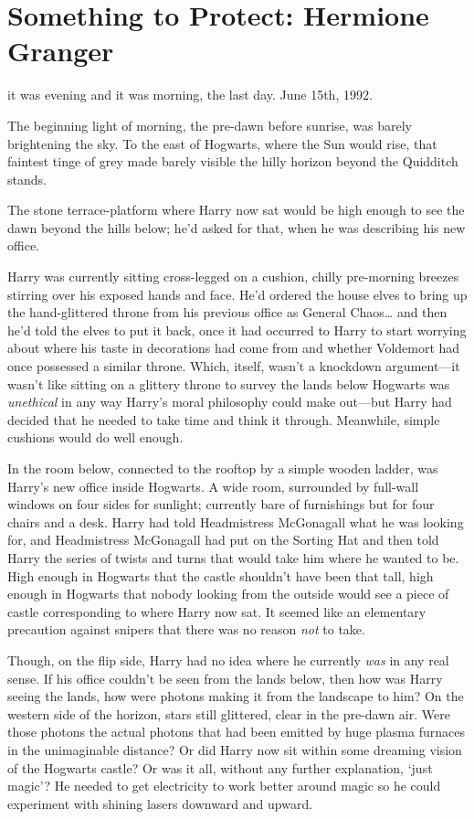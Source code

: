 \chapter{Something to Protect: Hermione Granger}

 it was evening and it was morning, the last day. June 15th, 1992.

\hplettrineextrapara
The beginning light of morning, the pre-dawn before sunrise, was barely brightening the sky. To the east of Hogwarts, where the Sun would rise, that faintest tinge of grey made barely visible the hilly horizon beyond the Quidditch stands.

The stone terrace-platform where Harry now sat would be high enough to see the dawn beyond the hills below; he'd asked for that, when he was describing his new office.

Harry was currently sitting cross-legged on a cushion, chilly pre-morning breezes stirring over his exposed hands and face. He'd ordered the house elves to bring up the hand-glittered throne from his previous office as General Chaos{\ldots} and then he'd told the elves to put it back, once it had occurred to Harry to start worrying about where his taste in decorations had come from and whether Voldemort had once possessed a similar throne. Which, itself, wasn't a knockdown argument—it wasn't like sitting on a glittery throne to survey the lands below Hogwarts was \emph{unethical} in any way Harry's moral philosophy could make out—but Harry had decided that he needed to take time and think it through. Meanwhile, simple cushions would do well enough.

In the room below, connected to the rooftop by a simple wooden ladder, was Harry's new office inside Hogwarts. A wide room, surrounded by full-wall windows on four sides for sunlight; currently bare of furnishings but for four chairs and a desk. Harry had told Headmistress McGonagall what he was looking for, and Headmistress McGonagall had put on the Sorting Hat and then told Harry the series of twists and turns that would take him where he wanted to be. High enough in Hogwarts that the castle shouldn't have been that tall, high enough in Hogwarts that nobody looking from the outside would see a piece of castle corresponding to where Harry now sat. It seemed like an elementary precaution against snipers that there was no reason \emph{not} to take.

Though, on the flip side, Harry had no idea where he currently \emph{was} in any real sense. If his office couldn't be seen from the lands below, then how was Harry seeing the lands, how were photons making it from the landscape to him? On the western side of the horizon, stars still glittered, clear in the pre-dawn air. Were those photons the actual photons that had been emitted by huge plasma furnaces in the unimaginable distance? Or did Harry now sit within some dreaming vision of the Hogwarts castle? Or was it all, without any further explanation, `just magic'? He needed to get electricity to work better around magic so he could experiment with shining lasers downward and upward.

